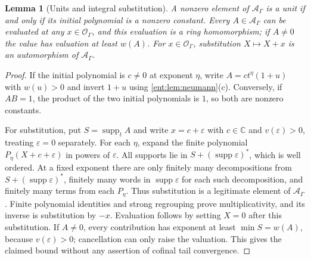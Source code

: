 \documentclass[11pt]{article}
\theoremstyle{plain}
\newtheorem{lemma}[lemma]{Lemma}
\theoremstyle{plain}
\theoremstyle{plain}
\theoremstyle{definition}
\theoremstyle{definition}
\theoremstyle{definition}
\theoremstyle{definition}
\theoremstyle{remark}
\newcommand{\C}{\mathbb C}\newcommand{\R}{\mathbb R}
\newcommand{\A}{\mathcal A_\Gamma}\newcommand{\OO}{\mathcal O_\Gamma}
\DeclareMathOperator{\supp}{supp}\DeclareMathOperator{\lc}{lc}
\begin{document}
\begin{lemma}[Units and integral substitution]\label{ent:lem:A-units}
A nonzero element of $\A$ is a unit if and only if its initial polynomial is a
nonzero constant. Every $A\in\A$ can be evaluated at any $x\in\OO$, and this
evaluation is a ring homomorphism; if $A\ne0$ the value has valuation at
least $w(A)$. For $x\in\OO$, substitution $X\mapsto X+x$ is an automorphism
of $\A$.
\end{lemma}
\begin{proof}
If the initial polynomial is $c\ne0$ at exponent $\eta$, write
$A=ct^\eta(1+u)$ with $w(u)>0$ and invert $1+u$ using
\cref{ent:lem:neumann}(c). Conversely, if $AB=1$, the product of the two
initial polynomials is $1$, so both are nonzero constants.

For substitution, put $S=\supp_t A$ and write $x=c+\varepsilon$ with $c\in\C$ and
$v(\varepsilon)>0$, treating $\varepsilon=0$ separately. For each $\eta$,
expand the finite polynomial $P_\eta(X+c+\varepsilon)$ in powers of
$\varepsilon$. All supports lie in $S+(\supp\varepsilon)^*$, which is well
ordered. At a fixed exponent there are only finitely many decompositions from
$S+(\supp\varepsilon)^*$, finitely many words in $\supp\varepsilon$ for each
such decomposition, and finitely many terms from each $P_\eta$. Thus
substitution is a legitimate element of $\A$. Finite polynomial identities
and strong regrouping prove multiplicativity, and its inverse is substitution
by $-x$. Evaluation follows by setting $X=0$ after this substitution. If
$A\ne0$, every contribution has exponent at least $\min S=w(A)$, because
$v(\varepsilon)>0$; cancellation can only raise the valuation. This gives
the claimed bound without any assertion of cofinal tail convergence.
\end{proof}
\end{document}
